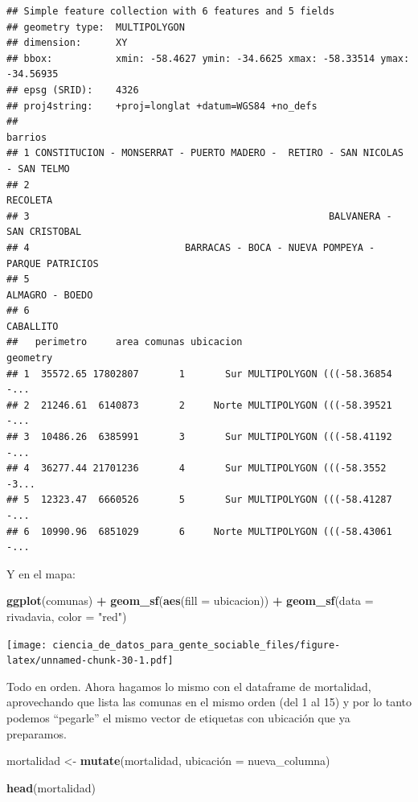 \documentclass[]{book}
\newenvironment{Shaded}{\begin{snugshade}}{\end{snugshade}}
\newcommand{\KeywordTok}[1]{\textcolor[rgb]{0.13,0.29,0.53}{\textbf{#1}}}
\newcommand{\DataTypeTok}[1]{\textcolor[rgb]{0.13,0.29,0.53}{#1}}
\newcommand{\StringTok}[1]{\textcolor[rgb]{0.31,0.60,0.02}{#1}}
\newcommand{\OperatorTok}[1]{\textcolor[rgb]{0.81,0.36,0.00}{\textbf{#1}}}
\newcommand{\NormalTok}[1]{#1}
\begin{document}
\begin{verbatim}
## Simple feature collection with 6 features and 5 fields
## geometry type:  MULTIPOLYGON
## dimension:      XY
## bbox:           xmin: -58.4627 ymin: -34.6625 xmax: -58.33514 ymax: -34.56935
## epsg (SRID):    4326
## proj4string:    +proj=longlat +datum=WGS84 +no_defs
##                                                                        barrios
## 1 CONSTITUCION - MONSERRAT - PUERTO MADERO -  RETIRO - SAN NICOLAS - SAN TELMO
## 2                                                                     RECOLETA
## 3                                                    BALVANERA - SAN CRISTOBAL
## 4                           BARRACAS - BOCA - NUEVA POMPEYA - PARQUE PATRICIOS
## 5                                                              ALMAGRO - BOEDO
## 6                                                                    CABALLITO
##   perimetro     area comunas ubicacion                       geometry
## 1  35572.65 17802807       1       Sur MULTIPOLYGON (((-58.36854 -...
## 2  21246.61  6140873       2     Norte MULTIPOLYGON (((-58.39521 -...
## 3  10486.26  6385991       3       Sur MULTIPOLYGON (((-58.41192 -...
## 4  36277.44 21701236       4       Sur MULTIPOLYGON (((-58.3552 -3...
## 5  12323.47  6660526       5       Sur MULTIPOLYGON (((-58.41287 -...
## 6  10990.96  6851029       6     Norte MULTIPOLYGON (((-58.43061 -...
\end{verbatim}

Y en el mapa:

\begin{Shaded}
\begin{Highlighting}[]
\KeywordTok{ggplot}\NormalTok{(comunas) }\OperatorTok{+}
\StringTok{    }\KeywordTok{geom_sf}\NormalTok{(}\KeywordTok{aes}\NormalTok{(}\DataTypeTok{fill =}\NormalTok{ ubicacion)) }\OperatorTok{+}
\StringTok{    }\KeywordTok{geom_sf}\NormalTok{(}\DataTypeTok{data =}\NormalTok{ rivadavia, }\DataTypeTok{color =} \StringTok{"red"}\NormalTok{)}
\end{Highlighting}
\end{Shaded}

\texttt{[image: ciencia\_de\_datos\_para\_gente\_sociable\_files/figure-latex/unnamed-chunk-30-1.pdf]}

Todo en orden. Ahora hagamos lo mismo con el dataframe de mortalidad,
aprovechando que lista las comunas en el mismo orden (del 1 al 15) y por
lo tanto podemos ``pegarle'' el mismo vector de etiquetas con ubicación
que ya preparamos.

\begin{Shaded}
\begin{Highlighting}[]
\NormalTok{mortalidad <-}\StringTok{ }\KeywordTok{mutate}\NormalTok{(mortalidad, ubicación =}\StringTok{ }\NormalTok{nueva_columna)}
                         
\KeywordTok{head}\NormalTok{(mortalidad)}
\end{Highlighting}
\end{Shaded}
\end{document}
